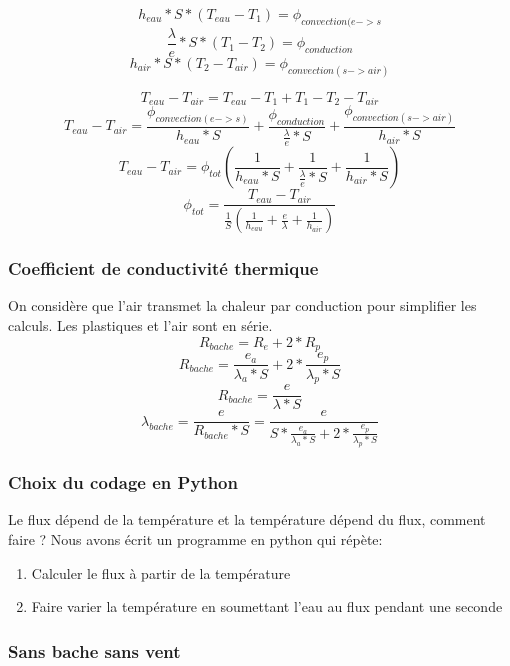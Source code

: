 \documentclass{beamer}
\begin{document}
  \begin{frame}
    \[h_{eau}*S*(T_{eau} - T_{1}) = \phi_{convection(e->s}\]
    \[\frac{\lambda}{e} * S * (T_{1} - T_{2}) = \phi_{conduction}\]
    \[h_{air}*S*(T_{2} - T_{air}) = \phi_{convection(s->air)}\]
  \end{frame}
  \begin{frame}
    \[T_{eau} - T_{air} = T_{eau} - T_{1} + T_{1} - T_{2} - T_{air}\]
    \[T_{eau} - T_{air} = \frac{\phi_{convection(e->s)}}{h_{eau}*S} + \frac{\phi_{conduction}}{\frac{\lambda}{e} * S} + \frac{\phi_{convection(s->air)}}{h_{air}*S} \]
    \[T_{eau} - T_{air} = \phi_{tot}(\frac{1}{h_{eau}*S} + \frac{1}{\frac{\lambda}{e} * S} + \frac{1}{h_{air}*S}) \]
    \[\phi_{tot} = \frac{T_{eau} - T_{air}}{\frac{1}{S}(\frac{1}{h_{eau}} + \frac{e}{\lambda} + \frac{1}{h_{air}})}\]
  \end{frame}
  \begin{frame}
   \frametitle{Coefficient de conductivité thermique}
   On considère que l'air transmet la chaleur par conduction pour simplifier les calculs.
   Les plastiques et l'air sont en série.
   \[R_{bache} = R_{e} + 2 * R_{p}\]
   \[R_{bache} = \frac{e_{a}}{\lambda_{a} * S} + 2 * \frac{e_{p}}{\lambda_{p} * S}\]
   \[R_{bache} = \frac{e}{\lambda * S}\]
   \[\lambda_{bache} = \frac{e}{R_{bache} * S} = \frac{e}{S* \frac{e_{a}}{\lambda_{a} * S} + 2 * \frac{e_{p}}{\lambda_{p} * S}}\]
   
  \end{frame}

  \begin{frame}
   \frametitle{Choix du codage en Python}
   Le flux dépend de la température et la température dépend du flux, comment faire ?
Nous avons écrit un programme en python qui répète:
    \begin{enumerate}
     \item Calculer le flux à partir de la température
     \item Faire varier la température en soumettant l’eau au flux pendant une seconde

    \end{enumerate}

  \end{frame}
  \begin{frame}
   \frametitle{Sans bache sans vent}
   
  \end{frame}


\end{document}
